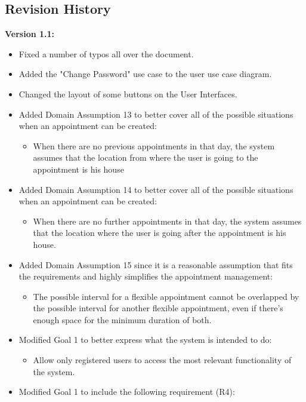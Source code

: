 \documentclass[12pt]{article}
\begin{document}
\subsection{Revision History}
\textbf{Version 1.1:} 
\begin{itemize}
    \item Fixed a number of typos all over the document.
    \item Added the "Change Password" use case to the user use case diagram.
    \item Changed the layout of some buttons on the User Interfaces.
    \item Added Domain Assumption 13 to better cover all of the possible situations when an appointment can be created: 
        \begin{itemize}
            \item When there are no previous appointments in that day, the system assumes that the location from where the user is going to the appointment is his house
        \end{itemize}
    \item Added Domain Assumption 14 to better cover all of the possible situations when an appointment can be created: 
        \begin{itemize}
            \item When there are no further appointments in that day, the system assumes that the location where the user is going after the appointment is his house.
        \end{itemize}
    \item Added Domain Assumption 15 since it is a reasonable assumption that fits the requirements and highly simplifies the appointment management: 
        \begin{itemize}
            \item The possible interval for a flexible appointment cannot be overlapped by the possible interval for another flexible appointment, even if there's enough space for the minimum duration of both.
        \end{itemize}
    \item Modified Goal 1 to better express what the system is intended to do: 
        \begin{itemize}
            \item Allow only registered users to access the most relevant functionality of the system.
        \end{itemize}
    \item Modified Goal 1 to include the following requirement (R4):

\end{itemize}
\end{document}
